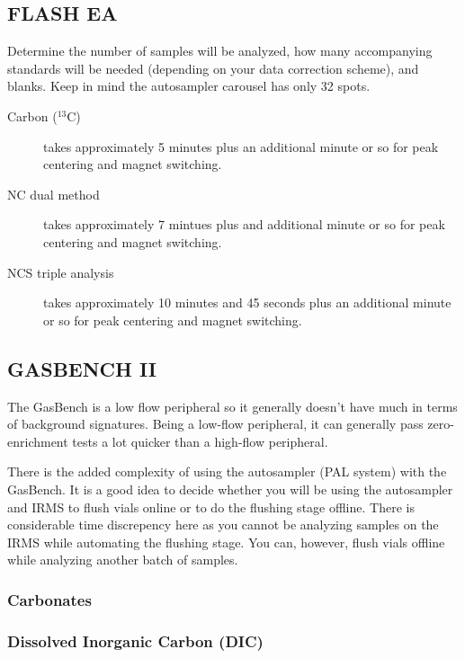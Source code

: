 \documentclass[12pt]{../SOP3_beta}\usepackage[]{graphicx}\usepackage[]{color}
\begin{document}
\subsection{FLASH EA}

\NP Determine the number of samples will be analyzed, how many accompanying standards will be needed (depending on your data correction scheme), and blanks. Keep in mind the autosampler carousel has only 32 spots.

\begin{description}

\item[Carbon ($^{13}$C)] 
takes approximately 5 minutes plus an additional minute or so for peak centering and magnet switching.

\item[NC dual method] 
takes approximately 7 mintues plus and additional minute or so for peak centering and magnet switching.

\item[NCS triple analysis] 
takes approximately 10 minutes and 45 seconds plus an additional minute or so for peak centering and magnet switching.

\end{description}

\subsection{GASBENCH II}

\NP The GasBench is a low flow peripheral so it generally doesn't have much in terms of background signatures. Being a low-flow peripheral, it can generally pass zero-enrichment tests a lot quicker than a high-flow peripheral.

\NP There is the added complexity of using the autosampler (PAL system) with the GasBench. It is a good idea to decide whether you will be using the autosampler and IRMS to flush vials online or to do the flushing stage offline. There is considerable time discrepency here as you cannot be analyzing samples on the IRMS while automating the flushing stage. You can, however, flush vials offline while analyzing another batch of samples. 

\subsubsection{Carbonates}

\subsubsection{Dissolved Inorganic Carbon (DIC)}
\end{document}
